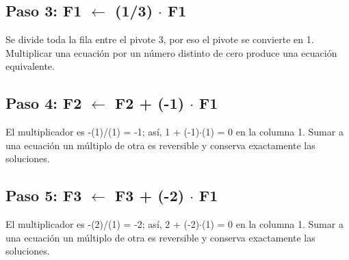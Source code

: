 \documentclass[conference]{IEEEtran}
\begin{document}
\medskip
\subsection*{Paso 3: F1 \(\leftarrow\) (1/3) \(\cdot\) F1}
Se divide toda la fila entre el pivote 3, por eso el pivote se convierte en 1. Multiplicar una ecuación por un número distinto de cero produce una ecuación equivalente.


\medskip
\subsection*{Paso 4: F2 \(\leftarrow\) F2 + (-1) \(\cdot\) F1}
El multiplicador es -(1)/(1) = -1; así, 1 + (-1)\(\cdot\)(1) = 0 en la columna 1. Sumar a una ecuación un múltiplo de otra es reversible y conserva exactamente las soluciones.


\medskip
\subsection*{Paso 5: F3 \(\leftarrow\) F3 + (-2) \(\cdot\) F1}
El multiplicador es -(2)/(1) = -2; así, 2 + (-2)\(\cdot\)(1) = 0 en la columna 1. Sumar a una ecuación un múltiplo de otra es reversible y conserva exactamente las soluciones.
\end{document}
